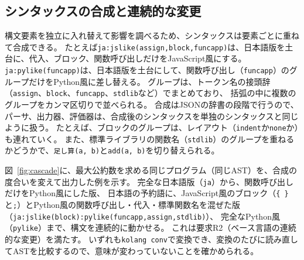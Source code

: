 \documentclass{ipsjprosym}
\begin{document}
\subsection{シンタックスの合成と連続的な変更}

構文要素を独立に入れ替えて影響を調べるため、シンタックスは要素ごとに重ねて合成できる。
たとえば\verb|ja:jslike(assign,block,funcapp)|は、日本語版を土台に、代入、ブロック、関数呼び出しだけをJavaScript風にする。
\verb|ja:pylike(funcapp)|は、日本語版を土台にして、関数呼び出し（\verb|funcapp|）のグループだけをPython風に差し替える。
グループは、トークン名の接頭辞（\verb|assign|、\verb|block|、\verb|funcapp|、\verb|stdlib|など）でまとめており、
括弧の中に複数のグループをカンマ区切りで並べられる。
合成はJSONの辞書の段階で行うので、パーサ、出力器、評価器は、合成後のシンタックスを単独のシンタックスと同じように扱う。
たとえば、ブロックのグループは、レイアウト（\verb|indent|か\verb|none|か）も連れていく。
また、標準ライブラリの関数名（\verb|stdlib|）のグループを重ねるかどうかで、\verb|足し算(a, b)|と\verb|add(a, b)|を切り替えられる。

図~\ref{fig:cascade}に、最大公約数を求める同じプログラム（同じAST）を、合成の度合いを変えて出力した例を示す。
完全な日本語版（\verb|ja|）から、関数呼び出しだけをPython風にした版、
日本語の予約語に、JavaScript風のブロック（\verb|{ }|と\verb|;|）とPython風の関数呼び出し・代入・標準関数名を混ぜた版（\verb|ja:jslike(block):pylike(funcapp,assign,stdlib)|）、
完全なPython風（\verb|pylike|）まで、構文を連続的に動かせる。
これは要求R2（ベース言語の連続的な変更）を満たす。
いずれも\verb|kolang conv|で変換でき、変換のたびに読み直してASTを比較するので、意味が変わっていないことを確かめられる。
\end{document}
